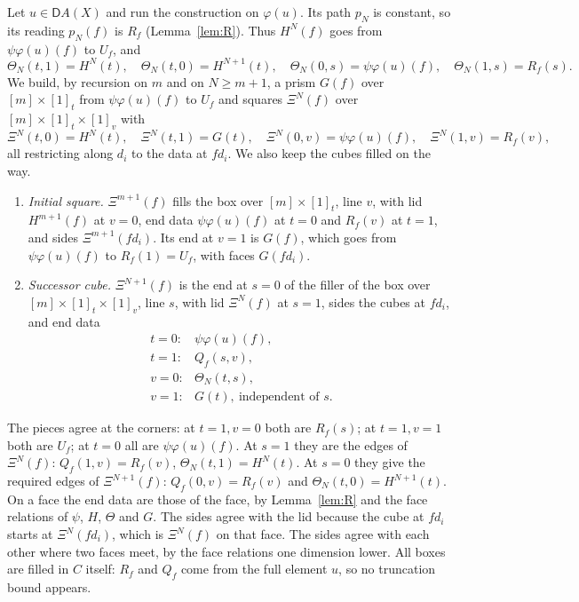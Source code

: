 \documentclass[11pt]{article}
\newcommand{\D}{\mathsf{D}}
\theoremstyle{plain}
\theoremstyle{definition}
\theoremstyle{remark}
\begin{document}
Let $u\in\D A(X)$ and run the construction on $\varphi(u)$. Its path
$p_N$ is constant, so its reading $p_N(f)$ is $R_f$ (Lemma~\ref{lem:R}).
Thus $H^N(f)$ goes from $\psi\varphi(u)(f)$ to $U_f$, and
\[
\Theta_N(t,1)=H^N(t),\quad\Theta_N(t,0)=H^{N+1}(t),\quad
\Theta_N(0,s)=\psi\varphi(u)(f),\quad\Theta_N(1,s)=R_f(s).
\]
We build, by recursion on $m$ and on $N\ge m+1$, a prism $G(f)$ over
$[m]\times[1]_t$ from $\psi\varphi(u)(f)$ to $U_f$ and squares
$\Xi^N(f)$ over $[m]\times[1]_t\times[1]_v$ with
\[
\Xi^N(t,0)=H^N(t),\quad\Xi^N(t,1)=G(t),\quad
\Xi^N(0,v)=\psi\varphi(u)(f),\quad\Xi^N(1,v)=R_f(v),
\]
all restricting along $d_i$ to the data at $fd_i$. We also keep the cubes
filled on the way.
\begin{enumerate}
\item \emph{Initial square.} $\Xi^{m+1}(f)$ fills the box over
  $[m]\times[1]_t$, line $v$, with lid $H^{m+1}(f)$ at $v=0$, end data
  $\psi\varphi(u)(f)$ at $t=0$ and $R_f(v)$ at $t=1$, and sides
  $\Xi^{m+1}(fd_i)$. Its end at $v=1$ is $G(f)$, which goes from
  $\psi\varphi(u)(f)$ to $R_f(1)=U_f$, with faces $G(fd_i)$.
\item \emph{Successor cube.} $\Xi^{N+1}(f)$ is the end at $s=0$ of the
  filler of the box over $[m]\times[1]_t\times[1]_v$, line $s$, with lid
  $\Xi^N(f)$ at $s=1$, sides the cubes at $fd_i$, and end data
  \[
  \begin{array}{ll}
  t=0: & \psi\varphi(u)(f),\\
  t=1: & Q_f(s,v),\\
  v=0: & \Theta_N(t,s),\\
  v=1: & G(t),\ \text{independent of }s.
  \end{array}
  \]
\end{enumerate}
The pieces agree at the corners: at $t=1,v=0$ both are $R_f(s)$; at
$t=1,v=1$ both are $U_f$; at $t=0$ all are $\psi\varphi(u)(f)$. At $s=1$
they are the edges of $\Xi^N(f)$: $Q_f(1,v)=R_f(v)$, $\Theta_N(t,1)=H^N(t)$.
At $s=0$ they give the required edges of $\Xi^{N+1}(f)$:
$Q_f(0,v)=R_f(v)$ and $\Theta_N(t,0)=H^{N+1}(t)$. On a face the end data
are those of the face, by Lemma~\ref{lem:R} and the face relations of
$\psi$, $H$, $\Theta$ and $G$. The sides agree with the lid because the
cube at $fd_i$ starts at $\Xi^N(fd_i)$, which is $\Xi^N(f)$ on that face.
The sides agree with each other where two faces meet, by the face
relations one dimension lower. All boxes are filled in $C$ itself: $R_f$
and $Q_f$ come from the full element $u$, so no truncation bound appears.
\end{document}
